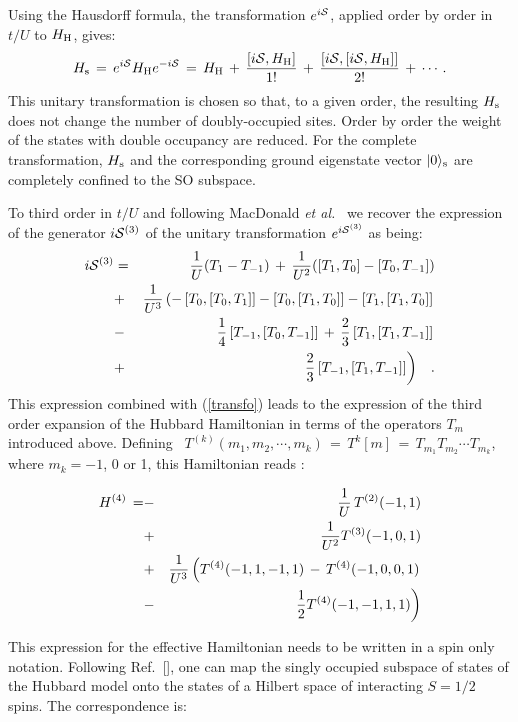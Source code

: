 \documentclass[aps,prb,twocolumn,superscriptaddress,
               amsmath]{revtex4}
\renewcommand{\=}{\,=\,}
\newcommand{\+}{\,+\,}
\renewcommand{\-}{\,-\,}
\newcommand{\trip}[3]{\ensuremath{\left[T_{#1},\left[T_{#2},T_{#3}\right]\right]}}
\newcommand{\f}[2]{{\ensuremath{\mathchoice%
        {\dfrac{#1}{#2}}
        {\dfrac{#1}{#2}}
        {\frac{#1}{#2}}
        {\frac{#1}{#2}}
        }}}
\begin{document}
Using the Hausdorff formula, the transformation $e^{i{\cal S}}$, applied order by
order in $t/U$ to $H_{\rm H}$, gives:
\begin{equation}
H_{\rm s}\,=\,e^{i {\cal S}}H_{\rm H}e^{-i{\cal S}}
\,=\,H_{\rm H} \,+\, \frac{[i{\cal S},H_{\rm H}]}{1!}\,+\,
\frac{[i{\cal S},[i{\cal S},H_{\rm H}]]}{2!} \,+\, \cdots .
\label{transfo}
\end{equation}
This unitary transformation is chosen so that, to a given order,
the resulting $H_{\rm s}$ does not change the number of doubly-occupied sites. Order by order the weight of the states with double occupancy are reduced. For the complete transformation, $H_{\rm s}$ and the corresponding ground eigenstate vector $|0\rangle_{\rm s}$ are completely confined to the SO subspace.

To third order in $t/U$ and following 
 MacDonald {\it et al.}~\cite{MacDonald} 
we recover the expression of the generator
$i{\cal S}^{(3)}$ of the unitary transformation $e^{i{\cal S}^{(3)}}$ as being:
\begin{eqnarray}
i{\cal S}^{(3)} & = & \f{1}{U}(T_1 - T_{-1}) \+ \f{1}{U^2}([T_1,T_0] - [T_0,T_{-1}])\nonumber\\
& + &  \f{1}{U^3} \left( -\trip{0}{0}{1} - \trip{0}{1}{0} - \trip{1}{1}{0}\right.\nonumber\\
& - & \left. \f{1}{4}\trip{-1}{0}{-1} \+\f{2}{3} \trip{1}{1}{-1}\right.\nonumber\\
& + & \left. \f{2}{3} \trip{-1}{1}{-1} \right)  \;\;\;.
\label{unitary}
\end{eqnarray}
This expression combined with (\ref{transfo}) leads to the expression of the
third order expansion of the Hubbard Hamiltonian in terms of the operators
$T_m$ introduced above. Defining~\cite{MacDonald}
$\displaystyle T^{(k)}(m_1, m_2,\cdots, m_k)
\= T^{k}[m] \= T_{m_1}T_{m_2}\cdots T_{m_k}$,
where $m_k=-1$, 0 or 1, this Hamiltonian reads : 

\begin{eqnarray}
H^{(4)}\,= & - &\f{1}{U} \, T^{(2)}(-1,1)\nonumber \\
& + &\f{1}{U^2} T^{(3)}(-1,0,1) \label{Hs4} \\
& + &\f{1}{U^3} \left(T^{(4)}(-1,1,-1,1) \- T^{(4)}(-1,0,0,1)\right.\nonumber\\
& - &\left.\f{1}{2} T^{(4)}(-1,-1,1,1) \right)\nonumber
\end{eqnarray}

This expression for the effective Hamiltonian needs to be written in a spin only notation. Following Ref.~[], one can map the singly occupied subspace of states of the Hubbard model onto the states of a Hilbert space of interacting $S=1/2$ spins. The correspondence is:
\end{document}
